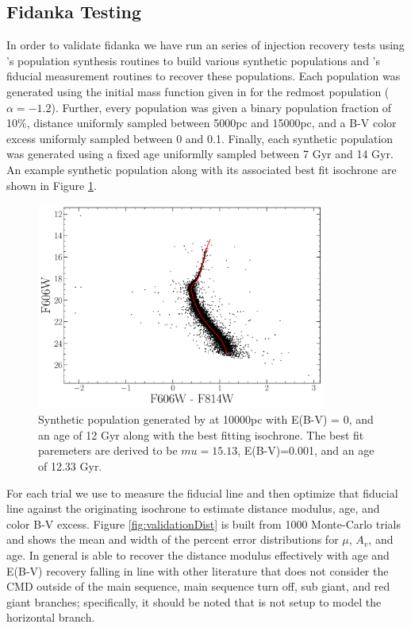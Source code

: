 \subsection{Fidanka Testing}
In order to validate fidanka we have run an series of injection recovery tests
using \fidanka's population synthesis routines to build various synthetic
populations and \fidanka's fiducial measurement routines to recover these
populations. Each population was generated using the initial mass function
given in \citep{Milone2012} for the redmost population ($\alpha=-1.2$).
Further, every population was given a binary population fraction of 10\%,
distance uniformly sampled between 5000pc and 15000pc, and a B-V color excess
uniformly sampled between 0 and 0.1. Finally, each synthetic population was
generated using a fixed age  uniformlly sampled between 7 Gyr and 14 Gyr. An
example synthetic population along with its associated best fit isochrone are
shown in Figure \ref{fig:ValidationBestFit}.

\begin{figure}
  \centering
  \includegraphics[width=0.85\textwidth]{figures/ngc2808/ExtractedIsoFit.pdf}
  \caption{Synthetic population generated by \fidanka at 10000pc with E(B-V) =
  0, and an age of 12 Gyr along with the best fitting isochrone. The best fit
  paremeters are derived to be $mu=15.13$, E(B-V)=0.001, and an age of 12.33
  Gyr.}
  \label{fig:ValidationBestFit}
\end{figure}

For each trial we use \fidanka to measure the fiducial line and then optimize
that fiducial line against the originating isochrone to estimate distance
modulus, age, and color B-V excess. Figure \ref{fig:validationDist} is built
from 1000 Monte-Carlo trials and shows the mean and width of the percent
error distributions for $\mu$, $A_{v}$, and age. In general \fidanka is able to
recover the distance modulus effectively with age and E(B-V) recovery falling in
line with other literature that does not consider the CMD outside of the main
sequence, main sequence turn off, sub giant, and red giant branches;
specifically, it should be noted that \fidanka is not setup to model the
horizontal branch.

